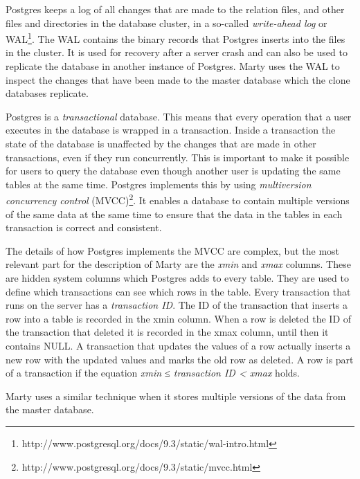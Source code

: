 Postgres keeps a log of all changes that are made to the relation files, and other files and directories in the database cluster, in a so-called \textit{write-ahead log} or WAL\footnote{http://www.postgresql.org/docs/9.3/static/wal-intro.html}.
The WAL contains the binary records that Postgres inserts into the files in the cluster.
It is used for recovery after a server crash and can also be used to replicate the database in another instance of Postgres.
Marty uses the WAL to inspect the changes that have been made to the master database which the clone databases replicate.

Postgres is a \textit{transactional} database.
This means that every operation that a user executes in the database is wrapped in a transaction.
Inside a transaction the state of the database is unaffected by the changes that are made in other transactions, even if they run concurrently.
This is important to make it possible for users to query the database even though another user is updating the same tables at the same time.
Postgres implements this by using \textit{multiversion concurrency control} (MVCC)\footnote{http://www.postgresql.org/docs/9.3/static/mvcc.html}.
It enables a database to contain multiple versions of the same data at the same time to ensure that the data in the tables in each transaction is correct and consistent.

The details of how Postgres implements the MVCC are complex, but the most relevant part for the description of Marty are the \textit{xmin} and \textit{xmax} columns.
These are hidden system columns which Postgres adds to every table.
They are used to define which transactions can see which rows in the table.
Every transaction that runs on the server has a \textit{transaction ID}.
The ID of the transaction that inserts a row into a table is recorded in the xmin column.
When a row is deleted the ID of the transaction that deleted it is recorded in the xmax column, until then it contains NULL.
A transaction that updates the values of a row actually inserts a new row with the updated values and marks the old row as deleted.
A row is part of a transaction if the equation \textit{xmin ≤ transaction ID < xmax} holds.

Marty uses a similar technique when it stores multiple versions of the data from the master database.